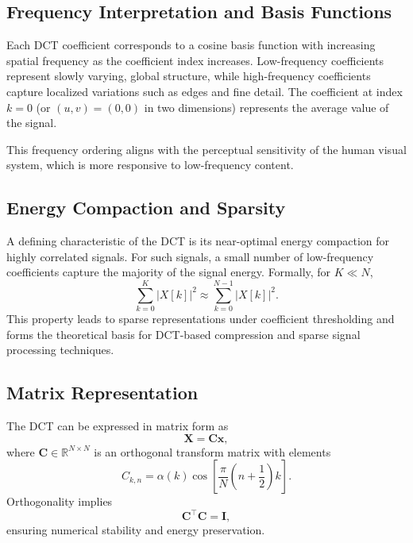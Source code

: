 \documentclass{article}
\begin{document}
\subsection{Frequency Interpretation and Basis Functions}

Each DCT coefficient corresponds to a cosine basis function with increasing spatial frequency as the coefficient index increases. Low-frequency coefficients represent slowly varying, global structure, while high-frequency coefficients capture localized variations such as edges and fine detail. The coefficient at index $k=0$ (or $(u,v)=(0,0)$ in two dimensions) represents the average value of the signal.

This frequency ordering aligns with the perceptual sensitivity of the human visual system, which is more responsive to low-frequency content.

\subsection{Energy Compaction and Sparsity}

A defining characteristic of the DCT is its near-optimal energy compaction for highly correlated signals. For such signals, a small number of low-frequency coefficients capture the majority of the signal energy. Formally, for $K \ll N$,
\begin{equation}
\sum_{k=0}^{K} |X[k]|^2 \approx
\sum_{k=0}^{N-1} |X[k]|^2.
\end{equation}
This property leads to sparse representations under coefficient thresholding and forms the theoretical basis for DCT-based compression and sparse signal processing techniques.

\subsection{Matrix Representation}

The DCT can be expressed in matrix form as
\begin{equation}
\mathbf{X} = \mathbf{C}\mathbf{x},
\end{equation}
where $\mathbf{C} \in \mathbb{R}^{N \times N}$ is an orthogonal transform matrix with elements
\begin{equation}
C_{k,n} = \alpha(k)
\cos\left[\frac{\pi}{N}\left(n + \frac{1}{2}\right)k\right].
\end{equation}
Orthogonality implies
\begin{equation}
\mathbf{C}^\top \mathbf{C} = \mathbf{I},
\end{equation}
ensuring numerical stability and energy preservation.
\end{document}
